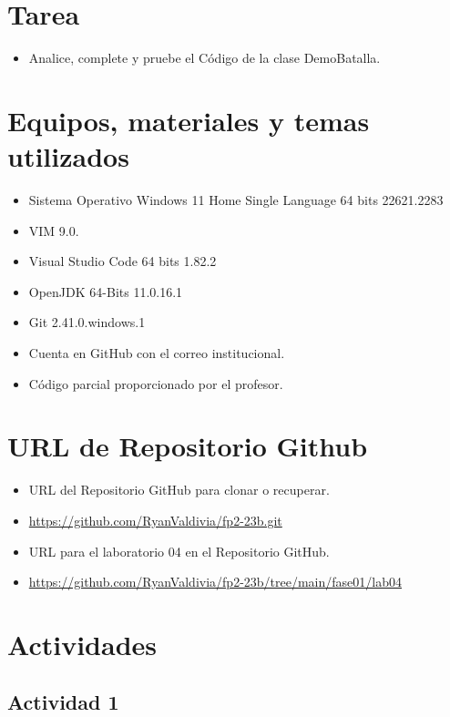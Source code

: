 \documentclass{article}
\begin{document}
	\section{Tarea}
	\begin{itemize}
		\subsection{Actividad: Demo Batalla}
			\item Analice, complete y pruebe el Código de la clase DemoBatalla.
	\end{itemize}
		
	\section{Equipos, materiales y temas utilizados}
	\begin{itemize}
		\item Sistema Operativo Windows 11 Home Single Language 64 bits 22621.2283
		\item VIM 9.0.
		\item Visual Studio Code 64 bits 1.82.2
		\item OpenJDK 64-Bits 11.0.16.1
		\item Git 2.41.0.windows.1
		\item Cuenta en GitHub con el correo institucional. 
		\item Código parcial proporcionado por el profesor.
	\end{itemize}
	
	\section{URL de Repositorio Github}
	\begin{itemize}
		\item URL del Repositorio GitHub para clonar o recuperar.
		\item \url{https://github.com/RyanValdivia/fp2-23b.git}
		\item URL para el laboratorio 04 en el Repositorio GitHub.
		\item \url{https://github.com/RyanValdivia/fp2-23b/tree/main/fase01/lab04}
	\end{itemize}
	
	\section{Actividades}
	\subsection{Actividad 1}
	
\end{document}
